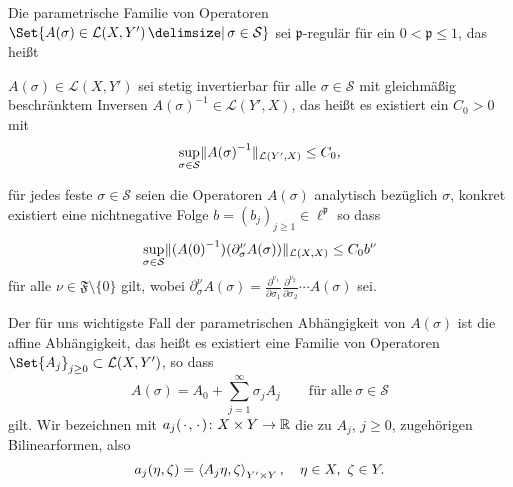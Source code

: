 \begin{Annahme}
\label{thm:kunoth:assumption1}
    Die parametrische Familie von Operatoren
    $\Set{ A(\sigma) \in \mathcal L(X, Y') \given \sigma \in \mathcal S }$ sei $\mathfrak p$-regulär für ein $0 < \mathfrak p \leq 1$, das heißt
    \begin{thmenumerate}
        \item $A(\sigma) \in \mathcal L(X, Y')$ sei stetig invertierbar für alle $\sigma \in \mathcal S$ mit gleichmäßig beschränktem Inversen $A{(\sigma)}^{-1} \in \mathcal L(Y', X)$, das heißt es existiert ein $C_{0} > 0$ mit
        \begin{equation}
            \sup_{\sigma \in \mathcal S} \lVert A{(\sigma)}^{-1}\rVert_{\mathcal L(Y', X)} \leq C_{0},
        \end{equation}
        \item für jedes feste $\sigma \in \mathcal S$ seien die Operatoren $A(\sigma)$ analytisch bezüglich $\sigma$, konkret existiert eine nichtnegative Folge $b = (b_{j})_{j \geq 1} \in \ell^{\mathfrak p}$ so dass
        \begin{equation}
            \sup_{\sigma \in \mathcal S} \lVert(A{(0)}^{-1})(\partial^{\nu}_{\sigma} A(\sigma))\rVert_{\mathcal L(X, X)} \leq C_{0} b^{\nu}
        \end{equation}
        für alle $\nu \in \mathfrak F \setminus \{ 0 \}$ gilt, wobei $\partial^{\nu}_{\sigma} A(\sigma) = \frac{\partial^{\nu_{1}}}{\partial \sigma_{1}} \frac{\partial^{\nu_{2}}}{\partial \sigma_{2}} \cdots A(\sigma)$ sei.
    \end{thmenumerate}
\end{Annahme}

Der für uns wichtigste Fall der parametrischen Abhängigkeit von $A(\sigma)$ ist die affine Abhängigkeit, das heißt es existiert eine Familie von Operatoren $\Set{ A_{j} }_{j \geq 0} \subset \mathcal L(X, Y')$, so dass
\begin{equation}
    \label{eq:all_affiner_operator}
    A(\sigma) = A_{0} + \sum_{j = 1}^{\infty} \sigma_{j} A_{j} \qquad\text{für alle}~\sigma \in \mathcal S
\end{equation}
gilt.
Wir bezeichnen mit $a_{j}({\mkern2mu\cdot\mkern2mu}, {\mkern2mu\cdot\mkern2mu}) \colon X \times Y \to \mathbb{R}$ die zu $A_{j}$, $j \geq 0$, zugehörigen Bilinearformen, also
\begin{equation}
    \label{eq:allg_affine_bf}
    a_{j}(\eta, \zeta) = \left\langle A_{j} \eta,\zeta\right\rangle_{Y' \times Y}, \quad \eta \in X,~\zeta \in Y.
\end{equation}

